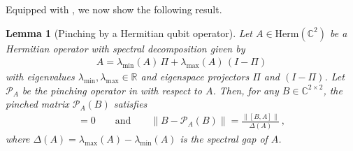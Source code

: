 \documentclass[a4paper,onecolumn,11pt]{quantumarticle}
\theoremstyle{plain}
\newtheorem{lemma}[theorem]{Lemma}
\begin{document}
Equipped with , we now show the following result.

\begin{lemma}[Pinching by a Hermitian qubit operator]\label{thm:pinch}
Let $A \in \mathrm{Herm}(\mathbb{C}^{2})$ be a Hermitian operator with spectral decomposition given by
\begin{align}
A = \lambda_{\min}(A)\,\Pi + \lambda_{\max}(A)\,(I-\Pi)
\end{align}
with eigenvalues $\lambda_{\min},\lambda_{\max} \in \mathbb{R}$ and eigenspace projectors $\Pi$ and $(I-\Pi)$. Let $\mathcal{P}_A$ be the pinching operator in  with respect to $A$.
Then, for any $B \in \mathbb{C}^{2 \times 2}$, the pinched matrix $\mathcal{P}_A(B)$ satisfies
\begin{align}
[\mathcal{P}_A(B), A] = 0
\qquad \text{and} \qquad
\|B - \mathcal{P}_A(B)\|
= \frac{\|[B,A]\|}{\Delta(A)} \,,
\end{align}
where $\Delta(A) = \lambda_{\max}(A) - \lambda_{\min}(A)$ is the spectral gap of $A$.
\end{lemma}
\end{document}
